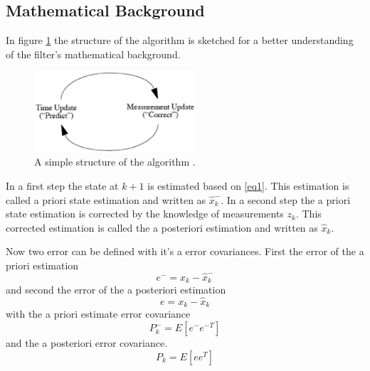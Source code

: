 \subsection*{Mathematical Background}\label{math_kalman}
In figure \ref{simple_schematic} the structure of the algorithm is sketched for a better understanding of the filter's mathematical background. 
\begin{figure}[h]
\begin{center}
\includegraphics[width=6cm]{pictures/simple_schematic_algo.eps}
\caption{A simple structure of the algorithm \cite{welch1997}.}
\label{simple_schematic}
\end{center}
\end{figure}
In a first step the state at $k+1$ is estimated based on \ref{eq1}. This estimation is called a priori state estimation and written as $\hat{x}_k^{-}$. In a second step the a priori state estimation is corrected by the knowledge of measurements $z_k$. This corrected estimation is called the a posteriori estimation and written as $\hat{x}_k$.

Now two error can be defined with it's a error covariances. First the error of the a priori estimation 
\begin{equation}
e^{-}=x_k-\hat{x}_k^{-}
\end{equation}
and second the error of the a posteriori estimation 
\begin{equation}
e=x_k-\hat{x}_k
\end{equation}
with the a priori estimate error covariance 
\begin{equation}
P^{-}_k=E[e^{-}e^{-T}]
\end{equation}
and the a posteriori error covariance.
\begin{equation}
P_k=E[ee^{T}]\label{P_post}
\end{equation}


